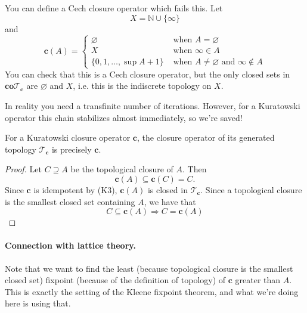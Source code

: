 \begin{example}
    You can define a Cech closure operator which fails this. Let
    \[
        X = \mathbb{N} \cup \{\infty\}
    \]
    and
    \[
        \mathbf{c}(A) = \begin{cases} 
            \varnothing &\text{ when } A = \varnothing \\
            X &\text{ when } \infty \in A \\
            \{0, 1, \ldots, \sup A + 1 \} &\text{ when } A \neq \varnothing \text{ and } \infty \not\in A
        \end{cases}
    \]
    You can check that this is a Cech closure operator, but the only closed sets in $\mathbf{co}\mathcal{T}_\mathbf{c}$ are $\varnothing$ and $X$, i.e. this is the indiscrete topology on $X$.
\end{example}
In reality you need a transfinite number of iterations. However, for a Kuratowski operator this chain stabilizes almost immediately, so we're saved!

\begin{lemma}
    For a Kuratowski closure operator $\mathbf{c}$, the closure operator of its generated topology $\mathcal{T}_\mathbf{c}$ is precisely $\mathbf{c}$.
\end{lemma}

\begin{proof}
    Let $C \supseteq A$ be the topological closure of $A$. Then
    \[
        \mathbf{c}(A) \subseteq \mathbf{c}(C) = C.
    \]
    Since $\mathbf{c}$ is idempotent by (K3), $\mathbf{c}(A)$ is closed in $\mathcal{T}_\mathbf{c}$. Since a topological closure is the smallest closed set containing $A$, we have that
    \[
        C \subseteq \mathbf{c}(A) \Rightarrow  C = \mathbf{c}(A)
    \]
\end{proof}

\paragraph{Connection with lattice theory.} Note that we want to find the least (because topological closure is the smallest closed set) fixpoint (because of the definition of topology) of $\mathbf{c}$ greater than $A$. This is exactly the setting of the Kleene fixpoint theorem, and what we're doing here is using that.



